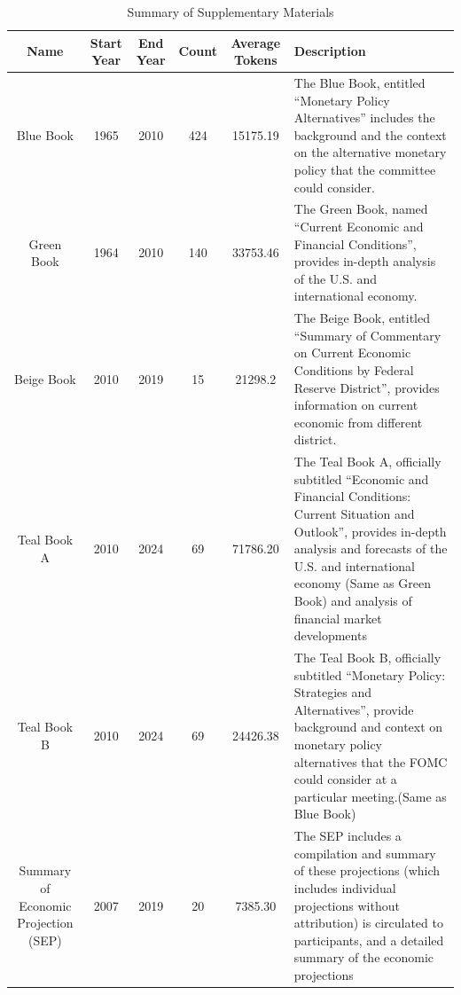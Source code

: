 \begin{table}
    \centering
    \footnotesize
    \begin{tabular}{c c c c c p{10cm}}
        \toprule
        Name&	Start Year&	End Year&	Count&	Average Tokens& \hspace{3.2cm} Description \\
        \hline
        Blue Book&	1965&	2010&	424&	15175.19&  The Blue Book, entitled ``Monetary Policy Alternatives'' includes the background and the context on the alternative monetary policy that the committee could consider.\\
        Green Book&	1964&	2010&	140&	33753.46&  The Green Book, named ``Current Economic and Financial Conditions'', provides in-depth analysis of the U.S. and international economy. \\
        Beige Book&	2010&	2019&	15&	    21298.2& The Beige Book, entitled ``Summary of Commentary on Current Economic Conditions by Federal Reserve District'', provides information on current economic from different district.\\
        Teal Book A&	2010&	2024&	69&	71786.20& The Teal Book A, officially subtitled ``Economic and Financial Conditions: Current Situation and Outlook'', provides in-depth analysis and forecasts of the U.S. and international economy (Same as Green Book) and analysis of financial market developments\\
        Teal Book B&	2010&	2024&	69&	24426.38& The Teal Book B, officially subtitled ``Monetary Policy: Strategies and Alternatives'', provide background and context on monetary policy alternatives that the FOMC could consider at a particular meeting.(Same as Blue Book)\\
        \makecell[c]{Summary of Economic Projection\\ (SEP)}&	2007&	2019&	20&	7385.30&  The SEP includes a compilation and summary of these projections (which includes individual projections without attribution) is circulated to participants, and a detailed summary of the economic projections\\
        \bottomrule
    \end{tabular}
    \caption{Summary of Supplementary Materials} 
    \label{tab:ch2:summary_supplementary_materials}
\end{table}


